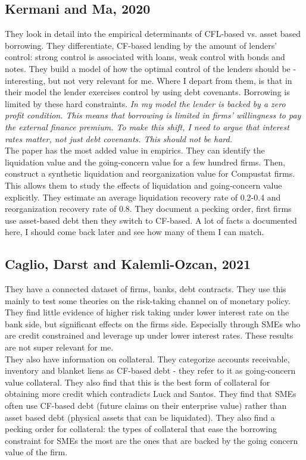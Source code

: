 \documentclass[12pt]{article}
\begin{document}
\subsection*{Kermani and Ma, 2020}
They look in detail into the empirical determinants of CFL-based vs. asset based borrowing. They differentiate, CF-based lending by the amount of lenders' control: strong control is associated with loans, weak control with bonds and notes. They build a model of how the optimal control of the lenders should be - interesting, but not very relevant for me. Where I depart from them, is that in their model the lender exercises control by using debt covenants. Borrowing is limited by these hard constraints. \textit{In my model the lender is backed by a zero profit condition. This means that borrowing is limited in firms' willingness to pay the external finance premium. To make this shift, I need to argue that interest rates matter, not just debt covenants. This should not be hard.}  \vspace{3mm} \\
The paper has the most added value in empirics. They can identify the liquidation value and the going-concern value for a few hundred firms. Then, construct a synthetic liquidation and reorganization value for Compustat firms. This allows them to study the effects of liquidation and going-concern value explicitly. They estimate an average liquidation recovery rate of 0.2-0.4 and reorganization recovery rate of 0.8. They document a pecking order, first firms use asset-based debt then they switch to CF-based. A lot of facts a documented here, I should come back later and see how many of them I can match. 

\subsection*{Caglio, Darst and Kalemli-Ozcan, 2021  \checkmark}
They have a connected dataset of firms, banks, debt contracts. They use this mainly to test some theories on the risk-taking channel on of monetary policy. They find little evidence of higher risk taking under lower interest rate on the bank side, but significant effects on the firms side. Especially through SMEs who are credit constrained and leverage up under lower interest rates. These results are not super relevant for me. \vspace{3mm} \\
They also have information on collateral. They categorize accounts receivable, inventory and blanket liens as CF-based debt - they refer to it as going-concern value collateral. They also find that this is the best form of collateral for obtaining more credit which contradicts Luck and Santos. They find that SMEs often use CF-based debt (future claims on their enterprise value) rather than asset based debt (physical assets that can be liquidated). They also find a pecking order for collateral: the types of collateral that ease the borrowing constraint for SMEs the most are the ones that are backed by the going concern value of the firm. 
\end{document}
